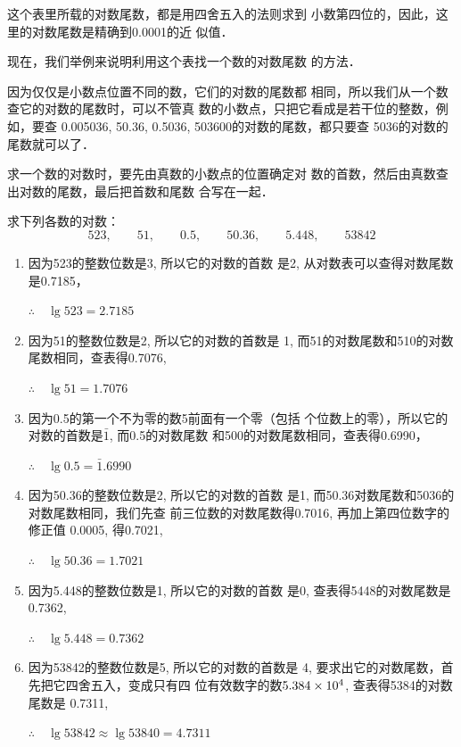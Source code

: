 这个表里所载的对数尾数，都是用四舍五入的法则求到
小数第四位的，因此，这里的对数尾数是精确到0.0001的近
似值．

现在，我们举例来说明利用这个表找一个数的对数尾数
的方法．

因为仅仅是小数点位置不同的数，它们的对数的尾数都
相同，所以我们从一个数查它的对数的尾数时，可以不管真
数的小数点，只把它看成是若干位的整数，例如，要查
0.005036, 50.36, 0.5036, 503600的对数的尾数，都只要查
5036的对数的尾数就可以了．

求一个数的对数时，要先由真数的小数点的位置确定对
数的首数，然后由真数查出对数的尾数，最后把首数和尾数
合写在一起．

\begin{example}
    求下列各数的对数：
\[523,\qquad 51,\qquad 0.5,\qquad 50.36,\qquad 5.448,\qquad 53842\]
\end{example}

\begin{solution}
\begin{enumerate}
    \item  因为523的整数位数是3, 所以它的对数的首数
    是2, 从对数表可以查得对数尾数是0.7185，

    $\therefore\quad \lg523=2.7185$
    \item  因为51的整数位数是2, 所以它的对数的首数是
    1, 而51的对数尾数和510的对数尾数相同，查表得0.7076,

    $\therefore\quad \lg51=1.7076$
    \item  因为0.5的第一个不为零的数5前面有一个零（包括
    个位数上的零），所以它的对数的首数是$\bar{1}$, 而0.5的对数尾数
    和500的对数尾数相同，查表得0.6990，

    $\therefore\quad \lg0.5=\bar{1}.6990$
    \item  因为50.36的整数位数是2, 所以它的对数的首数
    是1, 而50.36对数尾数和5036的对数尾数相同，我们先查
    前三位数的对数尾数得0.7016, 再加上第四位数字的修正值
    0.0005, 得0.7021,

    $\therefore\quad \lg50.36=1.7021$
    \item  因为5.448的整数位数是1, 所以它的对数的首数
    是0, 查表得5448的对数尾数是0.7362,

    $\therefore\quad \lg5.448=0.7362$
    \item  因为53842的整数位数是5, 所以它的对数的首数是
    4, 要求出它的对数尾数，首先把它四舍五入，变成只有四
    位有效数字的数$5.384\times10^4$, 查表得5384的对数尾数是
    0.7311,

    $\therefore\quad \lg53842\approx \lg53840=4.7311$
\end{enumerate}
\end{solution}    

